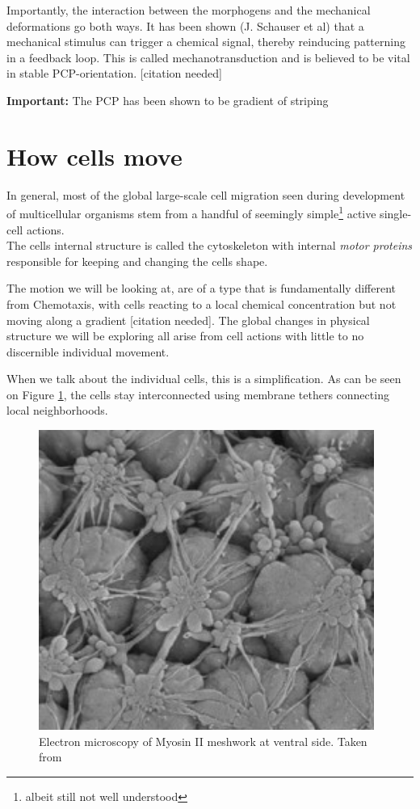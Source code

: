 Importantly, the interaction between the morphogens and the mechanical deformations go both ways. It has been shown (J. Schauser et al) that a mechanical stimulus can trigger a chemical signal, thereby reinducing patterning in a feedback loop. This is called mechanotransduction and is believed to be vital in stable PCP-orientation. [citation needed]


\textbf{Important:}
The PCP has been shown to be gradient of striping


\section{How cells move}

In general, most of the global large-scale cell migration seen during development of multicellular organisms stem from a handful of seemingly simple\footnote{albeit still not well understood} active single-cell actions.\cite{walck2014cell}\\
The cells internal structure is called the cytoskeleton with internal \textit{motor proteins} responsible for keeping and changing the cells shape.

The motion we will be looking at, are of a type that is fundamentally different from Chemotaxis, with cells reacting to a local chemical concentration but not moving along a gradient [citation needed]. The global changes in physical structure we will be exploring all arise from cell actions with little to no discernible individual movement.


When we talk about the individual cells, this is a simplification. As can be seen on Figure \ref{fig:mysosinMeshwork}, the cells stay interconnected using membrane tethers connecting local neighborhoods. 

\begin{figure}[H]
    \centering
    \includegraphics[width=0.6\linewidth]{chapters/Theory/figures/EM_constricting_proteins.png}
    \caption{Electron microscopy of Myosin II meshwork at ventral side. Taken from \cite{martin2010integration}}
    \label{fig:mysosinMeshwork}
\end{figure}

